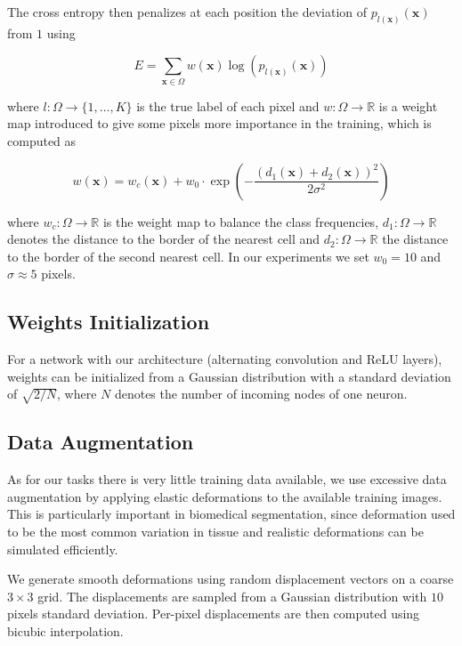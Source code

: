 \documentclass[a4paper,12pt]{article}
\begin{document}
The cross entropy then penalizes at each position the deviation of $p_{l(\mathbf{x})}(\mathbf{x})$ from $1$ using

\begin{equation}
E = \sum_{\mathbf{x} \in \Omega}w(\mathbf{x})\log(p_{l(\mathbf{x})}(\mathbf{x}))
\end{equation}

where $l : \Omega \to \{1,\ldots,K\}$ is the true label of each pixel and $w : \Omega \to \mathbb{R}$ is a weight map introduced to give some pixels more importance in the training, which is computed as

\begin{equation}
w(\mathbf{x}) = w_c(\mathbf{x}) + w_0 \cdot \exp\left(-\frac{(d_1(\mathbf{x}) + d_2(\mathbf{x}))^2}{2\sigma^2}\right)
\end{equation}

where $w_c : \Omega \to \mathbb{R}$ is the weight map to balance the class frequencies, $d_1 : \Omega \to \mathbb{R}$ denotes the distance to the border of the nearest cell and $d_2 : \Omega \to \mathbb{R}$ the distance to the border of the second nearest cell. In our experiments we set $w_0 = 10$ and $\sigma \approx 5$ pixels.

\subsection{Weights Initialization}

For a network with our architecture (alternating convolution and ReLU layers), weights can be initialized from a Gaussian distribution with a standard deviation of $\sqrt{2 / N}$, where $N$ denotes the number of incoming nodes of one neuron.

\subsection{Data Augmentation}

As for our tasks there is very little training data available, we use excessive data augmentation by applying elastic deformations to the available training images. This is particularly important in biomedical segmentation, since deformation used to be the most common variation in tissue and realistic deformations can be simulated efficiently.

We generate smooth deformations using random displacement vectors on a coarse $3 \times 3$ grid. The displacements are sampled from a Gaussian distribution with $10$ pixels standard deviation. Per-pixel displacements are then computed using bicubic interpolation.
\end{document}
